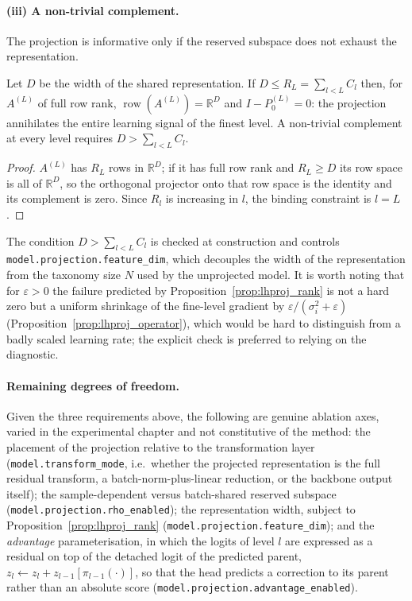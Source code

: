 \paragraph{(iii) A non-trivial complement.} The projection is informative only if
the reserved subspace does not exhaust the representation.

\begin{proposition}
\label{prop:lhproj_rank}
Let $D$ be the width of the shared representation. If $D\le R_L=\sum_{l<L}C_l$
then, for $A^{(L)}$ of full row rank, $\operatorname{row}(A^{(L)})=\mathbb{R}^{D}$
and $I-P^{(L)}_0=0$: the projection annihilates the entire learning signal of the
finest level. A non-trivial complement at every level requires
$D>\sum_{l<L}C_l$.
\end{proposition}
\begin{proof}
$A^{(L)}$ has $R_L$ rows in $\mathbb{R}^{D}$; if it has full row rank and
$R_L\ge D$ its row space is all of $\mathbb{R}^{D}$, so the orthogonal projector
onto that row space is the identity and its complement is zero. Since $R_l$ is
increasing in $l$, the binding constraint is $l=L$.
\end{proof}

The condition $D>\sum_{l<L}C_l$ is checked at construction and controls
\texttt{model.projection.feature\_dim}, which decouples the width of the
representation from the taxonomy size $N$ used by the unprojected model. It is
worth noting that for $\varepsilon>0$ the failure predicted by
Proposition~\ref{prop:lhproj_rank} is not a hard zero but a uniform shrinkage of
the fine-level gradient by $\varepsilon/(\sigma_i^2+\varepsilon)$
(Proposition~\ref{prop:lhproj_operator}), which would be hard to distinguish from
a badly scaled learning rate; the explicit check is preferred to relying on the
diagnostic.

\paragraph{Remaining degrees of freedom.} Given the three requirements above, the
following are genuine ablation axes, varied in the experimental chapter and not
constitutive of the method: the placement of the projection relative to the
transformation layer (\texttt{model.transform\_mode}, i.e.\ whether the projected
representation is the full residual transform, a batch-norm-plus-linear
reduction, or the backbone output itself); the sample-dependent versus
batch-shared reserved subspace (\texttt{model.projection.rho\_enabled}); the
representation width, subject to Proposition~\ref{prop:lhproj_rank}
(\texttt{model.projection.feature\_dim}); and the \emph{advantage}
parameterisation, in which the logits of level $l$ are expressed as a residual on
top of the detached logit of the predicted parent,
$z_l \leftarrow z_l + z_{l-1}[\pi_{l-1}(\cdot)]$, so that the head predicts a
correction to its parent rather than an absolute score
(\texttt{model.projection.advantage\_enabled}).

